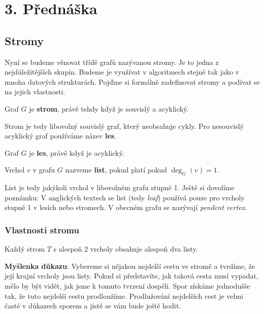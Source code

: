 \section{3. Přednáška}


\subsection{Stromy}
Nyní se budeme věnovat třídě grafů nazývanou stromy. Je to jedna z nejdůležitějších skupin. Budeme je využívat v algoritmech stejně tak jako v mnoha datových strukturách. Pojďme si formálně zadefinovat stromy a podívat se na jejich vlastnosti.

\begin{definition}
  Graf $G$ je \textbf{strom}, právě tehdy když je souvislý a acyklický.
\end{definition}

\noindent Strom je tedy libovolný souvislý graf, který neobsahuje cykly.
\noindent Pro nesouvislý acyklický graf používáme název \textbf{les}.

\begin{definition}
  Graf $G$ je \textbf{les}, právě když je acyklický.
\end{definition}

\begin{definition}
  Vrchol $v$ v grafu $G$ nazveme \textbf{list}, pokud platí pokud $\deg_G(v) = 1$.
\end{definition}

\noindent List je tedy jakýkoli vrchol v libovolném grafu stupně 1. Ještě si dovolíme poznámku: V anglických textech se list (tedy \textit{leaf}) používá pouze pro vrcholy stupně 1 v lesích nebo stromech. V obecném grafu se nazývají \textit{pendent vertex}.



\subsubsection{Vlastnosti stromu}

\begin{theorem}
Každý strom $T$ s alespoň $2$ vrcholy obsahuje alespoň dva listy.
\end{theorem} \medskip

\noindent \textbf{Myšlenka důkazu}: Vybereme si nějakou nejdelší cestu ve stromě a tvrdíme, že její krajní vrcholy jsou listy. Pokud si představíte, jak taková cesta musí vypadat, mělo by být vidět, jak jsme k tomuto tvrzení dospěli. Spor získáme jednodušše tak, že tuto nejdelší cestu prodloužíme. Prodlužování nejdelších cest je velmi časté v důkazech sporem a jistě se vám bude ještě hodit.\medskip


